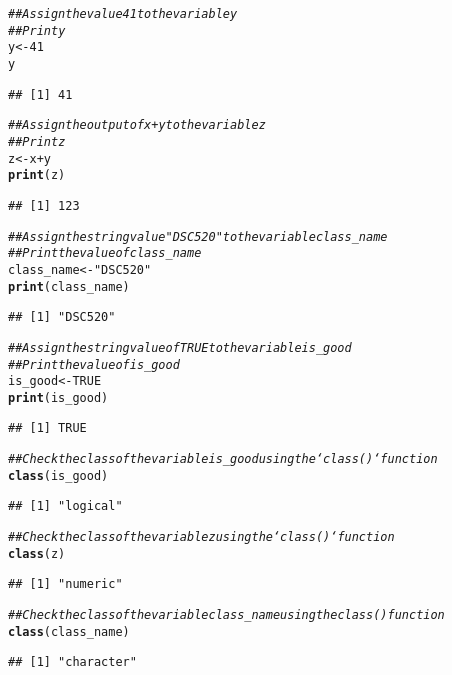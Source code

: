 \documentclass{article}\usepackage[]{graphicx}\usepackage[]{xcolor}
\makeatletter
\newcommand{\hlnum}[1]{\textcolor[rgb]{0.686,0.059,0.569}{#1}}%
\newcommand{\hlstr}[1]{\textcolor[rgb]{0.192,0.494,0.8}{#1}}%
\newcommand{\hlcom}[1]{\textcolor[rgb]{0.678,0.584,0.686}{\textit{#1}}}%
\newcommand{\hlopt}[1]{\textcolor[rgb]{0,0,0}{#1}}%
\newcommand{\hlstd}[1]{\textcolor[rgb]{0.345,0.345,0.345}{#1}}%
\newcommand{\hlkwb}[1]{\textcolor[rgb]{0.69,0.353,0.396}{#1}}%
\newcommand{\hlkwd}[1]{\textcolor[rgb]{0.737,0.353,0.396}{\textbf{#1}}}%
\newenvironment{kframe}{%
 \def\at@end@of@kframe{}%
 \ifinner\ifhmode%
  \def\at@end@of@kframe{\end{minipage}}%
  \begin{minipage}{\columnwidth}%
 \fi\fi%
 \def\FrameCommand##1{\hskip\@totalleftmargin \hskip-\fboxsep
 \colorbox{shadecolor}{##1}\hskip-\fboxsep
     \hskip-\linewidth \hskip-\@totalleftmargin \hskip\columnwidth}%
 \MakeFramed {\advance\hsize-\width
   \@totalleftmargin\z@ \linewidth\hsize
   \@setminipage}}%
 {\par\unskip\endMakeFramed%
 \at@end@of@kframe}
\newenvironment{knitrout}{}{} %
\makeatother
\begin{document}
\begin{knitrout}
\begin{kframe}
\begin{alltt}
\hlcom{## Assign the value 41 to the variable y}
\hlcom{## Print y}
\hlstd{y} \hlkwb{<-} \hlnum{41}
\hlstd{y}
\end{alltt}
\begin{verbatim}
## [1] 41
\end{verbatim}
\begin{alltt}
\hlcom{## Assign the output of x + y to the variable z}
\hlcom{## Print z}
\hlstd{z} \hlkwb{<-} \hlstd{x}\hlopt{+}\hlstd{y}
\hlkwd{print}\hlstd{(z)}
\end{alltt}
\begin{verbatim}
## [1] 123
\end{verbatim}
\begin{alltt}
\hlcom{## Assign the string value "DSC520" to the variable class_name}
\hlcom{## Print the value of class_name}
\hlstd{class_name} \hlkwb{<-} \hlstr{"DSC520"}
\hlkwd{print}\hlstd{(class_name)}
\end{alltt}
\begin{verbatim}
## [1] "DSC520"
\end{verbatim}
\begin{alltt}
\hlcom{## Assign the string value of TRUE to the variable is_good}
\hlcom{## Print the value of is_good}
\hlstd{is_good} \hlkwb{<-} \hlnum{TRUE}
\hlkwd{print}\hlstd{(is_good)}
\end{alltt}
\begin{verbatim}
## [1] TRUE
\end{verbatim}
\begin{alltt}
\hlcom{## Check the class of the variable is_good using the `class()` function}
\hlkwd{class}\hlstd{(is_good)}
\end{alltt}
\begin{verbatim}
## [1] "logical"
\end{verbatim}
\begin{alltt}
\hlcom{## Check the class of the variable z using the `class()` function}
\hlkwd{class}\hlstd{(z)}
\end{alltt}
\begin{verbatim}
## [1] "numeric"
\end{verbatim}
\begin{alltt}
\hlcom{## Check the class of the variable class_name using the class() function}
\hlkwd{class}\hlstd{(class_name)}
\end{alltt}
\begin{verbatim}
## [1] "character"
\end{verbatim}
\end{kframe}
\end{knitrout}
\end{document}
